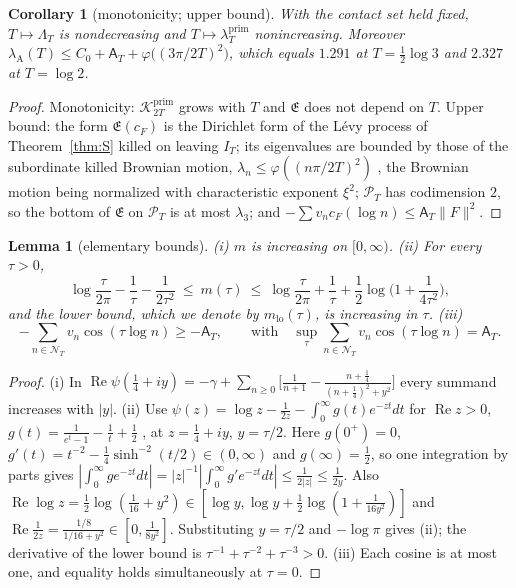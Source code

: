 \documentclass[10pt]{amsart}
\newtheorem{lemma}[theorem]{Lemma}
\newtheorem{corollary}[theorem]{Corollary}
\theoremstyle{definition}
\theoremstyle{remark}
\newcommand{\Rel}{\operatorname{Re}}
\newcommand{\Kp}{\mathcal K^{\mathrm{prim}}_{2T}}
\newcommand{\PT}{\mathcal P_T}
\newcommand{\IT}{I_T}
\newcommand{\lamP}{\lambda^{\mathrm{prim}}_T}
\newcommand{\lamA}{\lambda_{\mathrm A}(T)}
\newcommand{\cF}{c_F}
\newcommand{\Lev}{\mathfrak E}
\newcommand{\NT}{\mathcal N_T}
\newcommand{\Aconst}{\mathsf A_T}
\begin{document}
\begin{corollary}[monotonicity; upper bound]\label{cor:mono}
With the contact set held fixed, $T\mapsto\Lambda_T$ is nondecreasing and $T\mapsto\lamP$
nonincreasing. Moreover
$\lamA\le C_0+\Aconst+\varphi\big((3\pi/2T)^2\big)$, which equals $1.291$ at $T=\frac12\log3$ and
$2.327$ at $T=\log 2$.
\end{corollary}
\begin{proof}
Monotonicity: $\Kp$ grows with $T$ and $\Lev$ does not depend on $T$. Upper bound: the form
$\Lev(\cF)$ is the Dirichlet form of the L\'evy process of Theorem~\ref{thm:S} killed on
leaving $\IT$; its eigenvalues are bounded by those of the subordinate killed Brownian motion,
$\lambda_n\le\varphi((n\pi/2T)^2)$ \cite[Prop.~2.3]{SongVondracek2003}, the Brownian motion being
normalized with characteristic exponent $\xi^2$; $\PT$ has codimension
$2$, so the bottom of $\Lev$ on $\PT$ is at most $\lambda_3$; and $-\sum v_n\cF(\log n)\le\Aconst\|F\|^2$.
\end{proof}

\begin{lemma}[elementary bounds]\label{lem:mbounds}
\emph{(i)} $m$ is increasing on $[0,\infty)$. \emph{(ii)} For every $\tau>0$,
\[
\log\frac{\tau}{2\pi}-\frac1\tau-\frac1{2\tau^2}\ \le\ m(\tau)\ \le\ \log\frac{\tau}{2\pi}+\frac1\tau+\frac12\log\Big(1+\frac1{4\tau^2}\Big),
\]
and the lower bound, which we denote by $m_{\mathrm{lo}}(\tau)$, is increasing in $\tau$. \emph{(iii)}
\[
-\sum_{n\in\NT}v_n\cos(\tau\log n)\ge-\Aconst,\qquad\text{with}\quad
\sup_\tau\sum_{n\in\NT}v_n\cos(\tau\log n)=\Aconst.
\]
\end{lemma}
\begin{proof}
(i) In $\Rel\psi(\frac14+iy)=-\gamma+\sum_{n\ge0}\big[\frac1{n+1}-\frac{n+\frac14}{(n+\frac14)^2+y^2}\big]$
every summand increases with $|y|$. (ii) Use $\psi(z)=\log z-\frac1{2z}-\int_0^\infty g(t)e^{-zt}dt$
for $\Rel z>0$, $g(t)=\frac1{e^t-1}-\frac1t+\frac12$ \cite[5.9.13]{DLMF}, at $z=\frac14+iy$, $y=\tau/2$.
Here $g(0^+)=0$, $g'(t)=t^{-2}-\frac14\sinh^{-2}(t/2)\in(0,\infty)$ and $g(\infty)=\frac12$, so one
integration by parts gives $|\int_0^\infty g e^{-zt}dt|=|z|^{-1}|\int_0^\infty g'e^{-zt}dt|\le\frac1{2|z|}\le\frac1{2y}$.
Also $\Rel\log z=\frac12\log(\frac1{16}+y^2)\in[\log y,\log y+\frac12\log(1+\frac1{16y^2})]$ and
$\Rel\frac1{2z}=\frac{1/8}{1/16+y^2}\in[0,\frac1{8y^2}]$. Substituting $y=\tau/2$ and $-\log\pi$
gives (ii); the derivative of the lower bound is $\tau^{-1}+\tau^{-2}+\tau^{-3}>0$. (iii) Each cosine is at most one, and equality holds simultaneously at $\tau=0$.
\end{proof}
\end{document}
